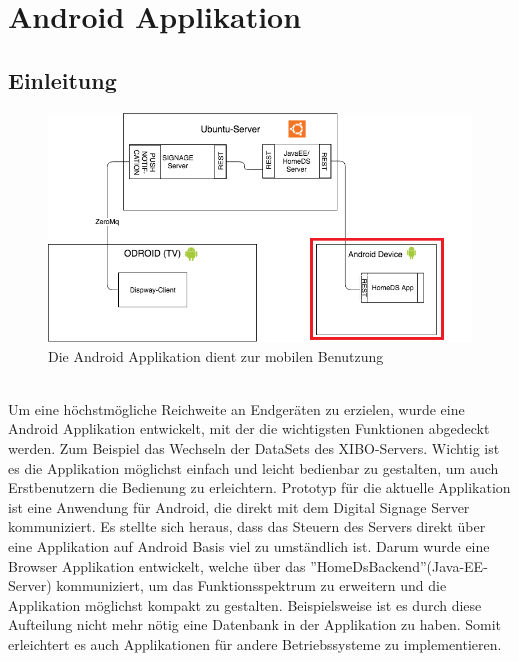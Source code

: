 \chapter{Android Applikation}
\section{Einleitung}
\begin{figure}[H]
\centering
\includegraphics[width=1.0\textwidth]{images/06_AndroidApp/06_SystemArch}
\caption{Die Android Applikation dient zur mobilen Benutzung}
\end{figure}
\\
Um eine höchstmögliche Reichweite an Endgeräten zu erzielen, wurde eine Android Applikation entwickelt, mit der die wichtigsten Funktionen abgedeckt werden. Zum Beispiel das Wechseln der DataSets des XIBO-Servers. Wichtig ist es die Applikation möglichst einfach und leicht bedienbar zu gestalten, um auch Erstbenutzern die Bedienung zu erleichtern. 
Prototyp für die aktuelle Applikation ist eine Anwendung für Android, die direkt mit dem Digital Signage Server kommuniziert. Es stellte sich heraus, dass das Steuern des Servers direkt über eine Applikation auf Android Basis viel zu umständlich ist. Darum wurde eine Browser Applikation entwickelt, welche über das ''HomeDsBackend''(Java-EE-Server) kommuniziert, um das Funktionsspektrum zu erweitern und die Applikation möglichst kompakt zu gestalten. Beispielsweise ist es durch diese Aufteilung nicht mehr nötig eine Datenbank in der Applikation zu haben. Somit erleichtert es auch Applikationen für andere Betriebssysteme zu implementieren. 
